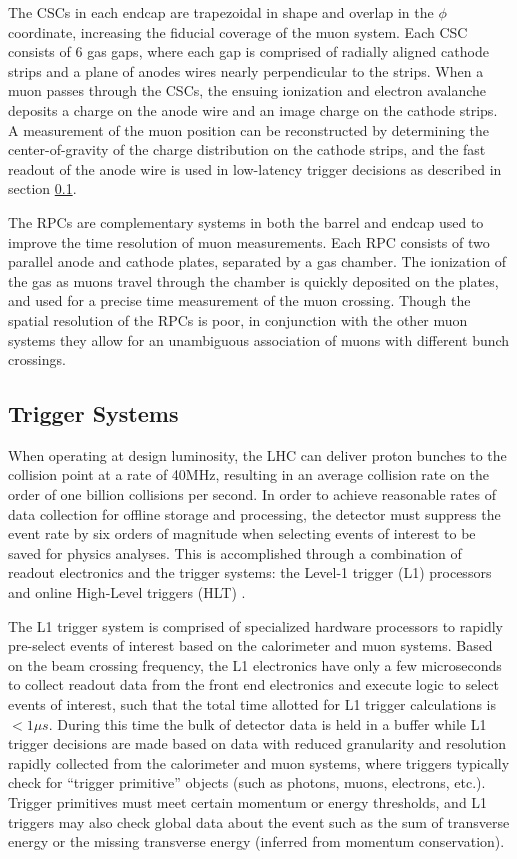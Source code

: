 The CSCs in each endcap are trapezoidal in shape and overlap in the $\phi$ coordinate, increasing the fiducial coverage of the muon system. Each CSC consists of 6 gas gaps, where each gap is comprised of radially aligned cathode strips and a plane of anodes wires nearly perpendicular to the strips. When a muon passes through the CSCs, the ensuing ionization and electron avalanche deposits a charge on the anode wire and an image charge on the cathode strips. A measurement of the muon position can be reconstructed by determining the center-of-gravity of the charge distribution on the cathode strips, and the fast readout of the anode wire is used in low-latency trigger decisions as described in section \ref{subsec:triggers}.

The RPCs are complementary systems in both the barrel and endcap used to improve the time resolution of muon measurements. Each RPC consists of two parallel anode and cathode plates, separated by a gas chamber. The ionization of the gas as muons travel through the chamber is quickly deposited on the plates, and used for a precise time measurement of the muon crossing. Though the spatial resolution of the RPCs is poor, in conjunction with the other muon systems they allow for an unambiguous association of muons with different bunch crossings.
 
\subsection{Trigger Systems}
\label{subsec:triggers}
When operating at design luminosity, the LHC can deliver proton bunches to the collision point at a rate of 40MHz, resulting in an average collision rate on the order of one billion collisions per second. In order to achieve reasonable rates of data collection for offline storage and processing, the detector must suppress the event rate by six orders of magnitude when selecting events of interest to be saved for physics analyses. This is accomplished through a combination of readout electronics and the trigger systems: the Level-1 trigger (L1) processors and online High-Level triggers (HLT) \cite{Lester:1999tx}.

The L1 trigger system is comprised of specialized hardware processors to rapidly pre-select events of interest based on the calorimeter and muon systems. Based on the beam crossing frequency, the L1 electronics have only a few microseconds to collect readout data from the front end electronics and execute logic to select events of interest, such that the total time allotted for L1 trigger calculations is $<1\mu s$. During this time the bulk of detector data is held in a buffer while L1 trigger decisions are made based on data with reduced granularity and resolution rapidly collected from the calorimeter and muon systems, where triggers typically check for ``trigger primitive'' objects (such as photons, muons, electrons, etc.). Trigger primitives must meet certain momentum or energy thresholds, and L1 triggers may also check global data about the event such as the sum of transverse energy or the missing transverse energy (inferred from momentum conservation). 


